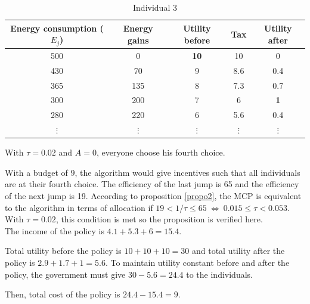 \documentclass[empty, english]{javaudin}
\begin{document}
\begin{table}[h]
	\centering
	\caption{Individual 3}
	\label{tab:label}
	\begin{tabular}{|c|c|c|c|c|}
		\hline
		Energy consumption ($E_j$) & Energy gains & Utility before & Tax & Utility after\\
		\hline
		500 & 0 & \textbf{10} & 10 & 0\\
		\hline
		430 & 70 & 9 & 8.6 & 0.4\\
		\hline
		365 & 135 & 8 & 7.3 & 0.7\\
		\hline
		300 & 200 & 7 & 6 & \textbf{1}\\
		\hline
		280 & 220 & 6 & 5.6 & 0.4\\
		\hline
		$\vdots$ & $\vdots$ & $\vdots$ & $\vdots$ & $\vdots$\\
		\hline
	\end{tabular}
\end{table}

With $\tau=0.02$ and $A=0$, everyone choose his fourth choice.

With a budget of $9$, the algorithm would give incentives such that all individuals are at their fourth choice. 
The efficiency of the last jump is 65 and the efficiency of the next jump is 19.
According to proposition \ref{propo2}, the MCP is equivalent to the algorithm in terms of allocation if $19 < 1/\tau \leq 65 ~\Leftrightarrow~ 0.015 \leq \tau < 0.053$.
With $\tau = 0.02$, this condition is met so the proposition is verified here.
\\

The income of the policy is $4.1 + 5.3 + 6 = 15.4$.

Total utility before the policy is $10 + 10 + 10 = 30$ and total utility after the policy is $2.9 + 1.7 + 1 = 5.6$.
To maintain utility constant before and after the policy, the government must give $30 - 5.6 = 24.4$ to the individuals.

Then, total cost of the policy is $24.4 - 15.4 = 9$.


\newpage
\end{document}
